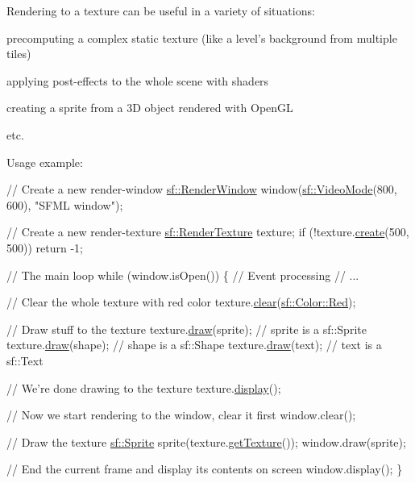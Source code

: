 Rendering to a texture can be useful in a variety of situations\+: \begin{DoxyItemize}
\item precomputing a complex static texture (like a level's background from multiple tiles) \item applying post-\/effects to the whole scene with shaders \item creating a sprite from a 3\+D object rendered with Open\+G\+L \item etc.\end{DoxyItemize}
Usage example\+:


\begin{DoxyCode}
\textcolor{comment}{// Create a new render-window}
\hyperlink{classsf_1_1_render_window}{sf::RenderWindow} window(\hyperlink{classsf_1_1_video_mode}{sf::VideoMode}(800, 600), \textcolor{stringliteral}{"SFML window"});

\textcolor{comment}{// Create a new render-texture}
\hyperlink{classsf_1_1_render_texture}{sf::RenderTexture} texture;
\textcolor{keywordflow}{if} (!texture.\hyperlink{classsf_1_1_render_texture_aefbb76eb3b87e368ab974b2660931ccb}{create}(500, 500))
    \textcolor{keywordflow}{return} -1;

\textcolor{comment}{// The main loop}
\textcolor{keywordflow}{while} (window.isOpen())
\{
   \textcolor{comment}{// Event processing}
   \textcolor{comment}{// ...}

   \textcolor{comment}{// Clear the whole texture with red color}
   texture.\hyperlink{classsf_1_1_render_target_a6bb6f0ba348f2b1e2f46114aeaf60f26}{clear}(\hyperlink{classsf_1_1_color_a127dbf55db9c07d0fa8f4bfcbb97594a}{sf::Color::Red});

   \textcolor{comment}{// Draw stuff to the texture}
   texture.\hyperlink{classsf_1_1_render_target_a12417a3bcc245c41d957b29583556f39}{draw}(sprite);  \textcolor{comment}{// sprite is a sf::Sprite}
   texture.\hyperlink{classsf_1_1_render_target_a12417a3bcc245c41d957b29583556f39}{draw}(shape);   \textcolor{comment}{// shape is a sf::Shape}
   texture.\hyperlink{classsf_1_1_render_target_a12417a3bcc245c41d957b29583556f39}{draw}(text);    \textcolor{comment}{// text is a sf::Text}

   \textcolor{comment}{// We're done drawing to the texture}
   texture.\hyperlink{classsf_1_1_render_texture_af92886d5faef3916caff9fa9ab32c555}{display}();

   \textcolor{comment}{// Now we start rendering to the window, clear it first}
   window.clear();

   \textcolor{comment}{// Draw the texture}
   \hyperlink{classsf_1_1_sprite}{sf::Sprite} sprite(texture.\hyperlink{classsf_1_1_render_texture_a95bc5152c497066d31fdc57da8e17678}{getTexture}());
   window.draw(sprite);

   \textcolor{comment}{// End the current frame and display its contents on screen}
   window.display();
\}
\end{DoxyCode}


